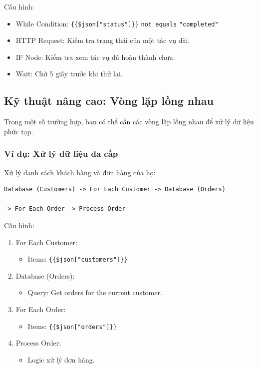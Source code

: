 Cấu hình:
\begin{itemize}
  \item While Condition: \texttt{\{\{\$json["status"]\}\}} \texttt{not equals} \texttt{"completed"}
  \item HTTP Request: Kiểm tra trạng thái của một tác vụ dài.
  \item IF Node: Kiểm tra xem tác vụ đã hoàn thành chưa.
  \item Wait: Chờ 5 giây trước khi thử lại.
\end{itemize}

\subsection{Kỹ thuật nâng cao: Vòng lặp lồng nhau}

Trong một số trường hợp, bạn có thể cần các vòng lặp lồng nhau để xử lý dữ liệu phức tạp.

\subsubsection{Ví dụ: Xử lý dữ liệu đa cấp}

Xử lý danh sách khách hàng và đơn hàng của họ:

\begin{verbatim}
Database (Customers) -> For Each Customer -> Database (Orders) 

-> For Each Order -> Process Order
\end{verbatim}

Cấu hình:
\begin{enumerate}
  \item For Each Customer:
  \begin{itemize}
    \item Items: \texttt{\{\{\$json["customers"]\}\}}
  \end{itemize}
  
  \item Database (Orders):
  \begin{itemize}
    \item Query: Get orders for the current customer.
  \end{itemize}
  
  \item For Each Order:
  \begin{itemize}
    \item Items: \texttt{\{\{\$json["orders"]\}\}}
  \end{itemize}
  
  \item Process Order:
  \begin{itemize}
    \item Logic xử lý đơn hàng.
  \end{itemize}
\end{enumerate}


